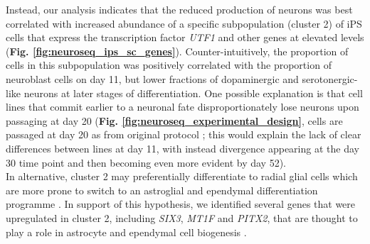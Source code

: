 Instead, our analysis indicates that the reduced production of neurons was best correlated with increased abundance of a specific subpopulation (cluster 2) of iPS cells that express the transcription factor \textit{UTF1} and other genes at elevated levels (\textbf{Fig. \ref{fig:neuroseq_ips_sc_genes}}).
Counter-intuitively, the proportion of cells in this subpopulation was positively correlated with the proportion of neuroblast cells on day 11, but lower fractions of dopaminergic and serotonergic-like neurons at later stages of differentiation. 
One possible explanation is that cell lines that commit earlier to a neuronal fate disproportionately lose neurons upon passaging at day 20 (\textbf{Fig. \ref{fig:neuroseq_experimental_design}}, cells are passaged at day 20 as from original protocol \cite{kriks2011dopamine}; this would explain the lack of clear differences between lines at day 11, with instead divergence appearing at the day 30 time point and then becoming even more evident by day 52).
\\

In alternative, cluster 2 may preferentially differentiate to radial glial cells which are more prone to switch to an astroglial and ependymal differentiation programme \cite{spassky2005adult}. 
In support of this hypothesis, we identified several genes that were upregulated in cluster 2, including \textit{SIX3}, \textit{MT1F} and \textit{PITX2}, that are thought to play a role in astrocyte and ependymal cell biogenesis \cite{lavado2011six3, michael2011up, jacquet2009foxj1}. \\




